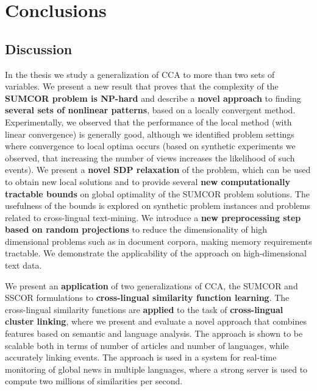 %
\chapter{Conclusions}\label{chap:conclusions}

\section{Discussion}

In the thesis we study a generalization of CCA to more than two
sets of variables. We present a new result that proves that
the complexity of the \textbf{SUMCOR problem
is NP-hard} and describe a \textbf{novel approach} to finding \textbf{several sets
of nonlinear patterns}, based on a locally convergent method.
Experimentally, we observed that the
performance of the local method (with linear convergence) is
generally good, although we identified problem settings where convergence to local optima occurs
 (based on synthetic experiments we observed,
that increasing the number of views increases the likelihood of such events).
We present a \textbf{novel SDP relaxation} of the problem, which can be used to obtain new
local solutions and to provide several \textbf{new computationally tractable bounds} on
global optimality of the SUMCOR problem solutions.
The usefulness of the bounds is explored on synthetic problem
instances and problems related to cross-lingual text-mining.
We introduce a \textbf{new preprocessing step based on random
projections} to reduce the dimensionality of high dimensional problems
such as in document corpora, making memory requirements tractable.
We demonstrate the applicability of the approach on high-dimensional
text data.

We present an \textbf{application} of two generalizations of CCA, the
SUMCOR and SSCOR formulations to \textbf{cross-lingual similarity function
learning}. The cross-lingual similarity functions are \textbf{applied} to
the task of \textbf{cross-lingual cluster linking}, where we present and evaluate a novel
approach that combines features based on semantic and language analysis.
The approach is shown to be scalable both in
terms of number of articles and number of languages, while accurately linking events.
The approach is used in a system for real-time monitoring of global news in
multiple languages, where a strong server is used to compute two millions
of similarities per second.

